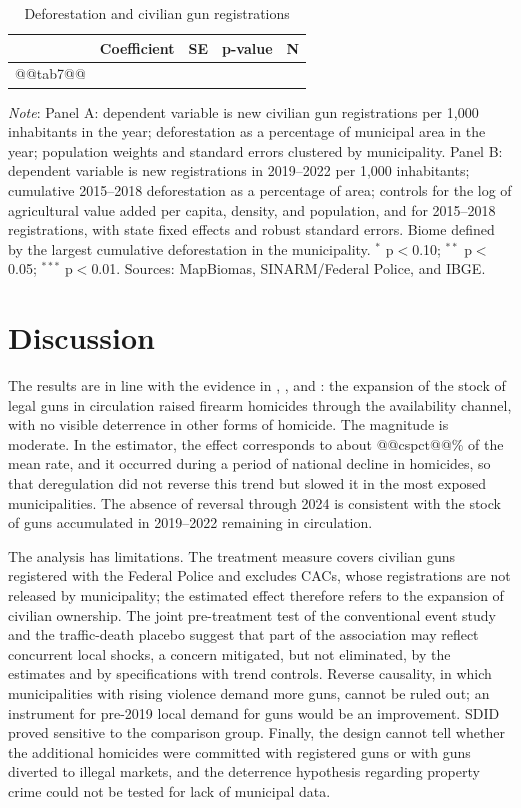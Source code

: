 \documentclass[11pt,a4paper]{article}
\newcommand{\nota}[1]{\par\vspace{2pt}\begin{minipage}{\linewidth}\footnotesize\textit{Note}: #1\end{minipage}}
\begin{document}
\begin{table}[H]
\centering\footnotesize\setlength{\tabcolsep}{4pt}
\caption{Deforestation and civilian gun registrations}\label{tab:desm}
\begin{tabular}{lcccc}
\toprule
 & Coefficient & SE & p-value & N \\
\midrule
@@tab7@@
\bottomrule
\end{tabular}
\nota{Panel A: dependent variable is new civilian gun registrations per 1,000 inhabitants in the year; deforestation as a percentage of municipal area in the year; population weights and standard errors clustered by municipality. Panel B: dependent variable is new registrations in 2019--2022 per 1,000 inhabitants; cumulative 2015--2018 deforestation as a percentage of area; controls for the log of agricultural value added per capita, density, and population, and for 2015--2018 registrations, with state fixed effects and robust standard errors. Biome defined by the largest cumulative deforestation in the municipality. $^{*}$ p$<$0.10; $^{**}$ p$<$0.05; $^{***}$ p$<$0.01. Sources: MapBiomas, SINARM/Federal Police, and IBGE.}
\end{table}

\section{Discussion}\label{sec:discussao}

The results are in line with the evidence in \citet{duggan2001}, \citet{cook2006}, and \citet{cerqueira2012}: the expansion of the stock of legal guns in circulation raised firearm homicides through the availability channel, with no visible deterrence in other forms of homicide. The magnitude is moderate. In the \citet{callaway2021} estimator, the effect corresponds to about @@cspct@@\% of the mean rate, and it occurred during a period of national decline in homicides, so that deregulation did not reverse this trend but slowed it in the most exposed municipalities. The absence of reversal through 2024 is consistent with the stock of guns accumulated in 2019--2022 remaining in circulation.

The analysis has limitations. The treatment measure covers civilian guns registered with the Federal Police and excludes CACs, whose registrations are not released by municipality; the estimated effect therefore refers to the expansion of civilian ownership. The joint pre-treatment test of the conventional event study and the traffic-death placebo suggest that part of the association may reflect concurrent local shocks, a concern mitigated, but not eliminated, by the \citet{callaway2021} estimates and by specifications with trend controls. Reverse causality, in which municipalities with rising violence demand more guns, cannot be ruled out; an instrument for pre-2019 local demand for guns would be an improvement. SDID proved sensitive to the comparison group. Finally, the design cannot tell whether the additional homicides were committed with registered guns or with guns diverted to illegal markets, and the deterrence hypothesis regarding property crime could not be tested for lack of municipal data.
\end{document}
